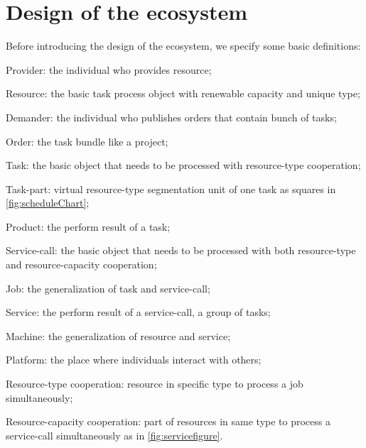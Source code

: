 \section{Design of the ecosystem} %
\label{sec:design_of_the_ecosystem}
Before introducing the design of the ecosystem, we specify some basic definitions:
\begin{compactitem}
	\item Provider: the individual who provides resource;
	\item Resource: the basic task process object with renewable capacity and unique type;
	\item Demander: the individual who publishes orders that contain bunch of tasks;
	\item Order: the task bundle like a project;
	\item Task: the basic object that needs to be processed with resource-type cooperation;
	\item Task-part: virtual resource-type segmentation unit of one task as squares in \autoref{fig:scheduleChart};
	\item Product: the perform result of a task;
    \item Service-call: the basic object that needs to be processed with both resource-type and resource-capacity cooperation;
    \item Job: the generalization of task and service-call;
    \item Service: the perform result of a service-call, a group of tasks;
    \item Machine: the generalization of resource and service;
	\item Platform: the place where individuals interact with others;
    \item Resource-type cooperation: resource in specific type to process a job simultaneously;
    \item Resource-capacity cooperation: part of resources in same type to process a service-call simultaneously as in \autoref{fig:servicefigure}.
\end{compactitem}

